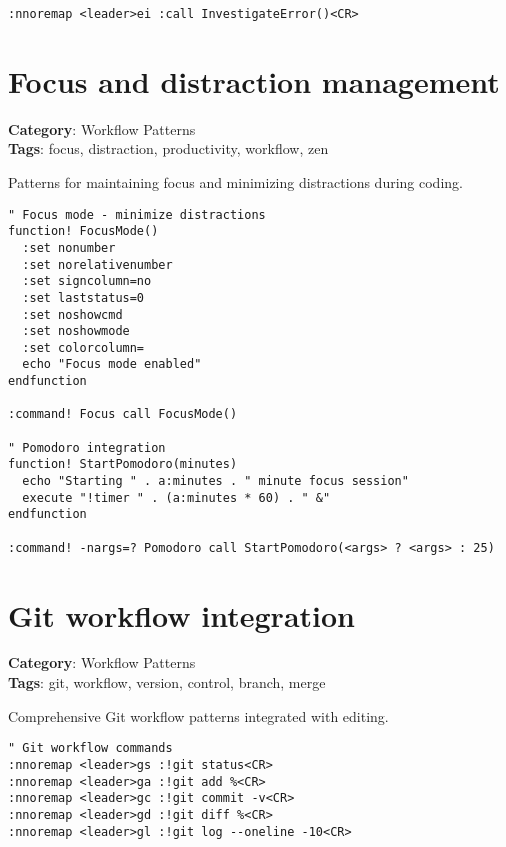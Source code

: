 {{{{{{{{{{{{{{{{{{{\begin{Exa*}{}
\begin{Verbatim}[fontsize=\footnotesize, breaklines, breakanywhere]
:nnoremap <leader>ei :call InvestigateError()<CR>
\end{Verbatim}
\end{Exa*}

\section{Focus and distraction management}

\textbf{Category}: Workflow Patterns\\ \textbf{Tags}: focus, distraction, productivity, workflow, zen
\vspace{0.5cm}

Patterns for maintaining focus and minimizing distractions during coding.

\begin{Exa*}{}
\begin{Verbatim}[fontsize=\footnotesize, breaklines, breakanywhere]
" Focus mode - minimize distractions
function! FocusMode()
  :set nonumber
  :set norelativenumber
  :set signcolumn=no
  :set laststatus=0
  :set noshowcmd
  :set noshowmode
  :set colorcolumn=
  echo "Focus mode enabled"
endfunction

:command! Focus call FocusMode()

" Pomodoro integration
function! StartPomodoro(minutes)
  echo "Starting " . a:minutes . " minute focus session"
  execute "!timer " . (a:minutes * 60) . " &"
endfunction

:command! -nargs=? Pomodoro call StartPomodoro(<args> ? <args> : 25)
\end{Verbatim}
\end{Exa*}

\section{Git workflow integration}

\textbf{Category}: Workflow Patterns\\ \textbf{Tags}: git, workflow, version, control, branch, merge
\vspace{0.5cm}

Comprehensive Git workflow patterns integrated with editing.

\begin{Exa*}{}
\begin{Verbatim}[fontsize=\footnotesize, breaklines, breakanywhere]
" Git workflow commands
:nnoremap <leader>gs :!git status<CR>
:nnoremap <leader>ga :!git add %<CR>
:nnoremap <leader>gc :!git commit -v<CR>
:nnoremap <leader>gd :!git diff %<CR>
:nnoremap <leader>gl :!git log --oneline -10<CR>


\end{Verbatim}
\end{Exa*}}}}}}}}}}}}}}}}}}}}
